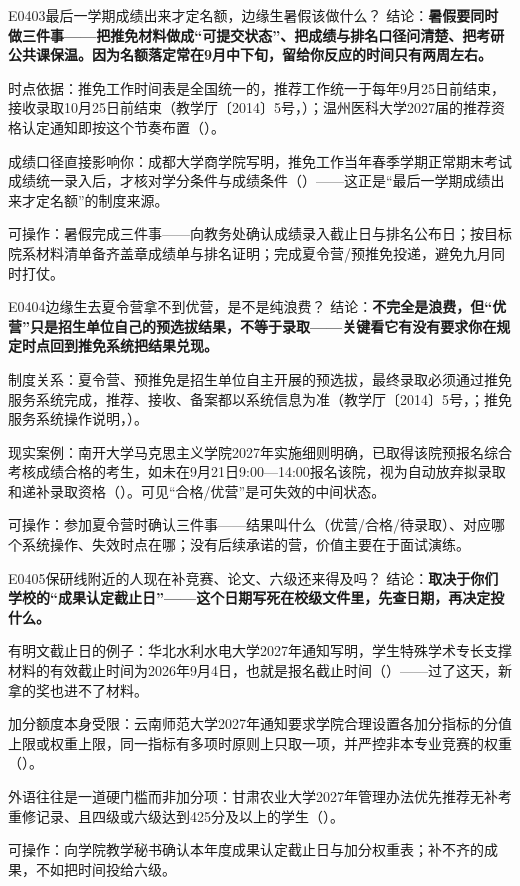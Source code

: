 \begin{qa}{E0403}{最后一学期成绩出来才定名额，边缘生暑假该做什么？}
结论：\textbf{暑假要同时做三件事——把推免材料做成“可提交状态”、把成绩与排名口径问清楚、把考研公共课保温。因为名额落定常在9月中下旬，留给你反应的时间只有两周左右。}

时点依据：推免工作时间表是全国统一的，推荐工作统一于每年9月25日前结束，接收录取10月25日前结束（教学厅〔2014〕5号，）；温州医科大学2027届的推荐资格认定通知即按这个节奏布置（）。

成绩口径直接影响你：成都大学商学院写明，推免工作当年春季学期正常期末考试成绩统一录入后，才核对学分条件与成绩条件（）——这正是“最后一学期成绩出来才定名额”的制度来源。

可操作：暑假完成三件事——向教务处确认成绩录入截止日与排名公布日；按目标院系材料清单备齐盖章成绩单与排名证明；完成夏令营/预推免投递，避免九月同时打仗。
\end{qa}

\begin{qa}{E0404}{边缘生去夏令营拿不到优营，是不是纯浪费？}
结论：\textbf{不完全是浪费，但“优营”只是招生单位自己的预选拔结果，不等于录取——关键看它有没有要求你在规定时点回到推免系统把结果兑现。}

制度关系：夏令营、预推免是招生单位自主开展的预选拔，最终录取必须通过推免服务系统完成，推荐、接收、备案都以系统信息为准（教学厅〔2014〕5号，；推免服务系统操作说明，）。

现实案例：南开大学马克思主义学院2027年实施细则明确，已取得该院预报名综合考核成绩合格的考生，如未在9月21日9:00—14:00报名该院，视为自动放弃拟录取和递补录取资格（）。可见“合格/优营”是可失效的中间状态。

可操作：参加夏令营时确认三件事——结果叫什么（优营/合格/待录取）、对应哪个系统操作、失效时点在哪；没有后续承诺的营，价值主要在于面试演练。
\end{qa}

\begin{qa}{E0405}{保研线附近的人现在补竞赛、论文、六级还来得及吗？}
结论：\textbf{取决于你们学校的“成果认定截止日”——这个日期写死在校级文件里，先查日期，再决定投什么。}

有明文截止日的例子：华北水利水电大学2027年通知写明，学生特殊学术专长支撑材料的有效截止时间为2026年9月4日，也就是报名截止时间（）——过了这天，新拿的奖也进不了材料。

加分额度本身受限：云南师范大学2027年通知要求学院合理设置各加分指标的分值上限或权重上限，同一指标有多项时原则上只取一项，并严控非本专业竞赛的权重（）。

外语往往是一道硬门槛而非加分项：甘肃农业大学2027年管理办法优先推荐无补考重修记录、且四级或六级达到425分及以上的学生（）。

可操作：向学院教学秘书确认本年度成果认定截止日与加分权重表；补不齐的成果，不如把时间投给六级。
\end{qa}

